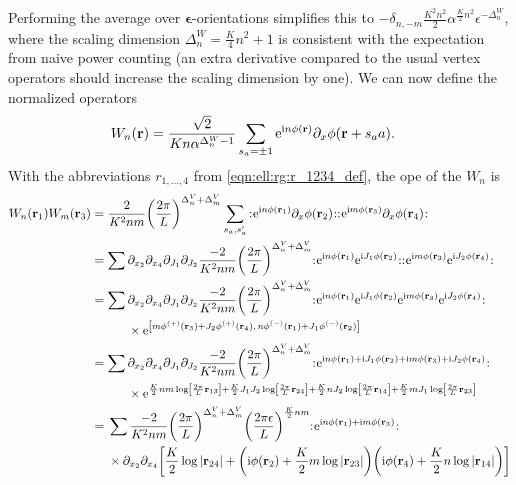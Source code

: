Performing the average over $\bm{\epsilon}$-orientations simplifies this to $-\delta_{n,-m} \frac{K^2n^2}{2} \alpha^{\frac{K}{2}n^2} \epsilon^{-\Delta^W_n}$, where the scaling dimension $\Delta^W_n = \frac{K}{4} n^2 + 1$ is consistent with the expectation from naive power counting (an extra derivative compared to the usual vertex operators should increase the scaling dimension by one). %
We can now define the normalized operators
\begin{align}
W_n(\textbf{r}) &= \frac{\sqrt{2}}{Kn\alpha^{\Delta^W_n - 1}} \sum_{s_a=\pm 1} \text{e}^{\text{i} n\phi(\textbf{r})} \partial_x\phi(\textbf{r}+ s_aa). \label{eqn:app:W_n_def}
\end{align}
With the abbreviations $r_{1,\dots,4}$ from \autoref{eqn:ell:rg:r_1234_def}, the \gls{ope} of the $W_n$ is
\begin{align*}
W_n(\textbf{r}_1) W_m(\textbf{r}_3) &= \frac{2}{K^2nm} \kla*{\frac{2\pi}{L}}^{\Delta^V_n + \Delta^V_m} \sum_{s_a,s_a'} \normord{\powe{\i n\phi(\textbf{r}_1)} \partial_x\phi(\textbf{r}_2)} \normord{\powe{\i m\phi(\textbf{r}_3)} \partial_x\phi(\textbf{r}_4)}\\
&= \sum \partial_{x_2} \partial_{x_4} \partial_{J_1} \partial_{J_2} \frac{-2}{K^2nm} \kla*{\frac{2\pi}{L}}^{\Delta^V_n + \Delta^V_m} \normord{\powe{\i n\phi(\textbf{r}_1)} \powe{\i J_1\phi(\textbf{r}_2)}} \normord{\powe{\i m\phi(\textbf{r}_3)} \powe{\i J_2\phi(\textbf{r}_4)}}\\
&= \sum \bsplit{& \partial_{x_2} \partial_{x_4} \partial_{J_1} \partial_{J_2} \frac{-2}{K^2nm} \kla*{\frac{2\pi}{L}}^{\Delta^V_n + \Delta^V_m} \normord{\powe{\i n\phi(\textbf{r}_1)} \powe{\i J_1\phi(\textbf{r}_2)} \powe{\i m\phi(\textbf{r}_3)} \powe{\i J_2\phi(\textbf{r}_4)}} \\
&\times \powe{\klb*{m\phi\eplus(\textbf{r}_3) + J_2 \phi\eplus(\textbf{r}_4),\, n\phi\eminus(\textbf{r}_1) + J_1 \phi\eminus(\textbf{r}_2)}}}\\
&= \sum \bsplit{& \partial_{x_2} \partial_{x_4} \partial_{J_1} \partial_{J_2} \frac{-2}{K^2nm} \kla*{\frac{2\pi}{L}}^{\Delta^V_n + \Delta^V_m}  \normord{\powe{\i n\phi(\textbf{r}_1) + \i J_1\phi(\textbf{r}_2) + \i m\phi(\textbf{r}_3) + \i J_2\phi(\textbf{r}_4)}} \\
&\times \powe{\frac{K}{2} nm \log \klb*{\frac{2\pi}{L} \textbf{r}_{13}} + \frac{K}{2} J_1J_2 \log \klb*{\frac{2\pi}{L} \textbf{r}_{24}} + \frac{K}{2} nJ_2 \log \klb*{\frac{2\pi}{L} \textbf{r}_{14}} + \frac{K}{2} mJ_1 \log \klb*{\frac{2\pi}{L} \textbf{r}_{23}} }}\\
&= \bsplit{&\sum \frac{-2}{K^2nm} \kla*{\frac{2\pi}{L}}^{\Delta^V_n + \Delta^V_m} \kla*{\frac{2\pi\epsilon}{L}}^{\frac{K}{2}nm} \normord{\powe{\i n\phi(\textbf{r}_1) + \i m\phi(\textbf{r}_3)}} \\
&\times \partial_{x_2} \partial_{x_4} \klb*{\frac{K}{2} \log |\textbf{r}_{24}| + \kla*{\i \phi(\textbf{r}_2) + \frac{K}{2} m\log |\textbf{r}_{23}|} \kla*{\i \phi(\textbf{r}_4) + \frac{K}{2} n\log |\textbf{r}_{14}|}} }
\end{align*}
